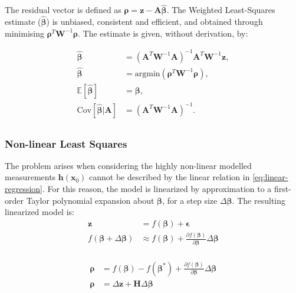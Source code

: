 The residual vector is defined as $\bm{\rho}=\bm{z}-\bm{A}\hat{\bm{\beta}}$. The
Weighted Least-Squares estimate ($\bm{\hat{\beta}}$) is unbiased, consistent and
efficient, and obtained through minimising $\bm{\rho}^T\bm{W}^{-1}\bm{\rho}$.
The estimate is given, without derivation, by:


\begin{equation}
    \begin{aligned}
        \bm{\hat{\beta}} &= (\bm{A}^T\bm{W}^{-1}\bm{A})^{-1}\bm{A}^T\bm{W}^{-1}\bm{z}, \\
        \bm{\hat{\beta}} &= \text{argmin}(\bm{\rho}^T\bm{W}^{-1}\bm{\rho}), \\
        \mathbb{E}[\bm{\hat{\beta}}] &= \bm{\beta}, \\
        \text{Cov}[\bm{\hat{\beta}}|\bm{A}] &= (\bm{A}^T\bm{W}^{-1}\bm{A})^{-1}. \\
    \end{aligned}
\end{equation}

\subsubsection{Non-linear Least Squares}

The problem arises when considering the highly non-linear modelled measurements
$\bm{h}(\bm{x}_0)$ cannot be described by the linear relation in
\autoref{eq:linear-regression}. For this reason, the model is linearized by
approximation to a first-order Taylor polynomial expansion about $\bm{\beta}$,
for a step size $\Delta\bm{\beta}$. The resulting linearized model is:
\begin{equation}
    \begin{aligned}
        \bm{z}                              &=        f(\bm{\beta}) + \bm{\epsilon}                                                              \\
        f(\bm{\beta}+\Delta\bm{\beta}) &\approx  f(\bm{\beta}) + \frac{\partial{f(\bm{\beta})}}{\partial{\bm{\beta}}}\Delta\bm{\beta}  \\
    \end{aligned}
\end{equation}

\begin{equation}
    \begin{aligned}
        \bm{\rho} &= f(\bm{\beta}) - f(\bm{\beta}^*)  + \frac{\partial{f(\bm{\beta})}}{\partial{\bm{\beta}}}\Delta\bm{\beta}  \\
        \bm{\rho} &= \Delta\bm{z}  + \bm{H}\Delta\bm{\beta}  \\
    \end{aligned}
\end{equation}

